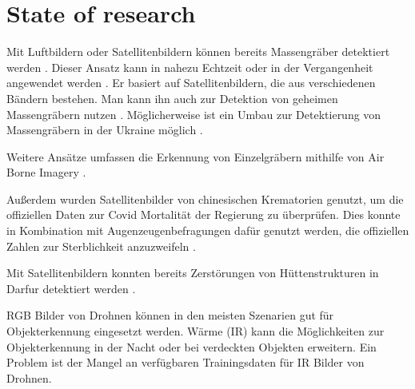 \chapter{State of research}
\label{ch:state_of_research}

Mit Luftbildern oder Satellitenbildern können bereits Massengräber detektiert werden \cite{Kalacska2006}. 
Dieser Ansatz kann in nahezu Echtzeit oder in der Vergangenheit angewendet werden \cite{Kalacska2006}. 
Er basiert auf Satellitenbildern, die aus verschiedenen Bändern bestehen. 
Man kann ihn auch zur Detektion von geheimen Massengräbern nutzen \cite{Kalacska2006}. 
Möglicherweise ist ein Umbau zur Detektierung von Massengräbern in der Ukraine möglich \cite{Kalacska2006}.

Weitere Ansätze umfassen die Erkennung von Einzelgräbern mithilfe von Air Borne Imagery \cite{Leblanc2014}.

Außerdem wurden Satellitenbilder von chinesischen Krematorien genutzt, um die offiziellen Daten zur Covid Mortalität der Regierung zu überprüfen. 
Dies konnte in Kombination mit Augenzeugenbefragungen dafür genutzt werden, die offiziellen Zahlen zur Sterblichkeit anzuzweifeln \cite{Spiegel_article}.

Mit Satellitenbildern konnten bereits Zerstörungen von Hüttenstrukturen in Darfur detektiert werden \cite{Knoth2017}. 




RGB Bilder von Drohnen können in den meisten Szenarien gut für Objekterkennung eingesetzt werden. 
Wärme (IR) kann die Möglichkeiten zur Objekterkennung in der Nacht oder bei verdeckten Objekten erweitern. 
Ein Problem ist der Mangel an verfügbaren Trainingsdaten für IR Bilder von Drohnen. 


